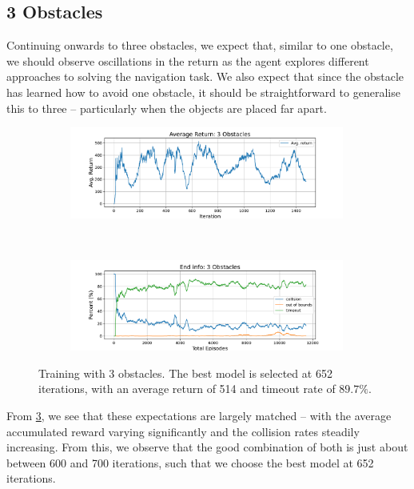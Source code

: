 \subsection{3 Obstacles}
\label{subsec:7_3_obstacles}
Continuing onwards to three obstacles, we expect that, similar to one obstacle, we should observe oscillations in the return as the agent explores different approaches to solving the navigation task. We also expect that since the obstacle has learned how to avoid one obstacle, it should be straightforward to generalise this to three -- particularly when the objects are placed far apart.
\begin{figure}[htb]
    \centering
    \begin{subfigure}[b]{\textwidth}
        \centering
        \captionsetup{justification=centering}
        \includegraphics[width=0.99\textwidth]{figures/7_/3DCarModel_BodyObs_NavSetup_3_NewObs_v1_reward.pdf}
        \label{fig:3_obst_nav_rew}
    \end{subfigure} \\
    \begin{subfigure}[b]{\textwidth}
        \centering
        \captionsetup{justification=centering}
        \includegraphics[width=0.99\textwidth]{figures/7_/3DCarModel_BodyObs_NavSetup_3_NewObs_v1_end_info.pdf}
        \label{fig:3_obst_nav_end}
    \end{subfigure} 
    \caption{Training with 3 obstacles. The best model is selected at 652 iterations, with an average return of 514 and timeout rate of $89.7\%$.} %
    \label{fig:7_train_nav_3_obst}
\end{figure}
From \cref{fig:7_train_nav_3_obst}, we see that these expectations are largely matched -- with the average accumulated reward varying significantly and the collision rates steadily increasing. From this, we observe that the good combination of both is just about between 600 and 700 iterations, such that we choose the best model at 652 iterations.

